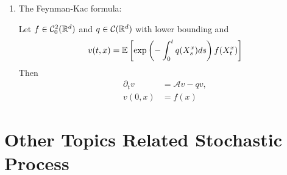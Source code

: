 \documentclass[a4paper,12pt]{article}
\begin{document}
\begin{enumerate}[label=\arabic*.]
  \item The Feynman-Kac formula:
  \begin{thm}
    Let $f \in \mathcal{C}_0^2(\mathbb{R}^d)$ and $q \in \mathcal{C}(\mathbb{R}^d)$ with lower bounding and
    \begin{equation*}
      v(t,x) = \mathbb{E}\left[\exp\left(-\int_0^tq(X_s^x)ds\right)f(X_t^x)\right]
    \end{equation*}
    Then
    \begin{equation*}
      \begin{split}
        \partial_tv &= \mathcal{A}v-qv,\\
        v(0,x) &= f(x)
      \end{split}
    \end{equation*}
  \end{thm}
\end{enumerate}

\section{Other Topics Related Stochastic Process}
\end{document}
